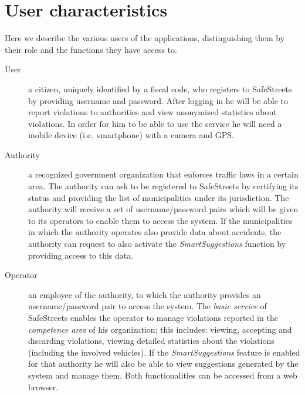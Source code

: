 \section{User characteristics}
Here we describe the various users of the applications, distinguishing
them by their role and the functions they have access to.

\begin{description}
    \item[User] a citizen, uniquely identified by a fiscal code, who registers
    to SafeStreets by providing username and password.
    After logging in he will be able to report violations to authorities
    and view anonymized statistics about violations.
    In order for him to be able to use the service he will need a mobile
    device (i.e.\ smartphone) with a camera and GPS.

    \item[Authority] a recognized government organization that enforces
    traffic laws in a certain area.
    The authority can ask to be registered to SafeStreets by certifying its
    status and providing the list of municipalities under its jurisdiction.
    The authority will receive a set of username/password pairs which will
    be given to its operators to enable them to access the system.
    If the municipalities in which the authority operates also provide
    data about accidents, the authority can request to also activate
    the \emph{SmartSuggestions} function by providing access to this
    data.
    
    \item[Operator] an employee of the authority, to which the authority
    provides an username/password pair to access the system.
    The \emph{basic service} of SafeStreets enables the operator to manage
    violations reported in the \emph{competence area} of his organization;
    this includes: viewing, accepting and discarding violations,
    viewing detailed statistics about the violations (including the
    involved vehicles). 
    If the \emph{SmartSuggestions} feature is enabled for that authority
    he will also be able to view suggestions generated by the system and
    manage them.
    Both functionalities can be accessed from a web browser.

\end{description}